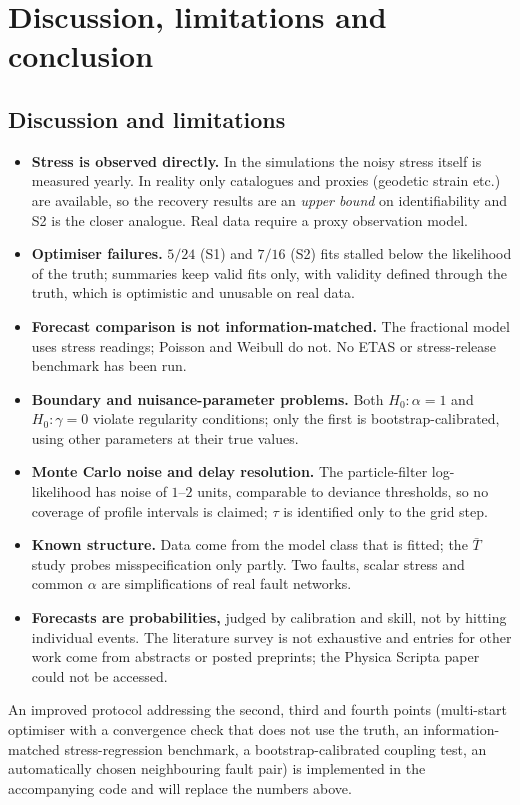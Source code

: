 \documentclass[10pt,a4paper]{article}
\newcommand{\Tb}{\bar T}
\begin{document}
\section{Discussion, limitations and conclusion}
\subsection{Discussion and limitations}
\begin{itemize}\setlength\itemsep{1pt}
\item \textbf{Stress is observed directly.} In the simulations the noisy stress itself is measured yearly. In reality only catalogues and proxies (geodetic strain etc.) are available, so the recovery results are an \emph{upper bound} on identifiability and S2 is the closer analogue. Real data require a proxy observation model.
\item \textbf{Optimiser failures.} $5/24$ (S1) and $7/16$ (S2) fits stalled below the likelihood of the truth; summaries keep valid fits only, with validity defined through the truth, which is optimistic and unusable on real data.
\item \textbf{Forecast comparison is not information-matched.} The fractional model uses stress readings; Poisson and Weibull do not. No ETAS or stress-release benchmark has been run.
\item \textbf{Boundary and nuisance-parameter problems.} Both $H_0:\alpha=1$ and $H_0:\gamma=0$ violate regularity conditions; only the first is bootstrap-calibrated, using other parameters at their true values.
\item \textbf{Monte Carlo noise and delay resolution.} The particle-filter log-likelihood has noise of $1$--$2$ units, comparable to deviance thresholds, so no coverage of profile intervals is claimed; $\tau$ is identified only to the grid step.
\item \textbf{Known structure.} Data come from the model class that is fitted; the $\Tb$ study probes misspecification only partly. Two faults, scalar stress and common $\alpha$ are simplifications of real fault networks.
\item \textbf{Forecasts are probabilities,} judged by calibration and skill, not by hitting individual events. The literature survey is not exhaustive and entries for other work come from abstracts or posted preprints; the Physica Scripta paper \citep{PhysScr2024} could not be accessed.
\end{itemize}
An improved protocol addressing the second, third and fourth points (multi-start optimiser with a convergence check that does not use the truth, an information-matched stress-regression benchmark, a bootstrap-calibrated coupling test, an automatically chosen neighbouring fault pair) is implemented in the accompanying code and will replace the numbers above.
\end{document}
